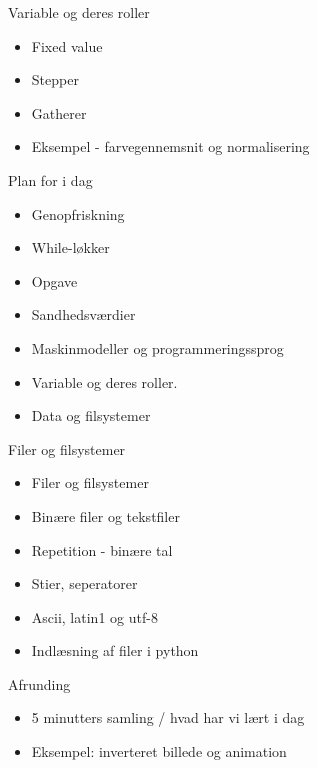 \documentclass[a4paper,landscape]{slides}
\begin{document}
\begin{slide}
	\begin{center} {\large 
            Variable og deres roller
	} \end{center}
	\begin{itemize} \addtolength{\itemsep}{-\baselineskip}
    		\item Fixed value
                \item Stepper
                \item Gatherer

                \item Eksempel - farvegennemsnit og normalisering
	\end{itemize}
\end{slide}

\begin{slide}
	\begin{center} {\large 
            Plan for i dag
	} \end{center}
	\begin{itemize} \addtolength{\itemsep}{-\baselineskip}
    		\item Genopfriskning
    		\item While-løkker
    		\item Opgave
    		\item Sandhedsværdier
    		\item Maskinmodeller og programmeringssprog
    		\item Variable og deres roller.
    		\item Data og filsystemer
	\end{itemize}
\end{slide}

\begin{slide}
	\begin{center} {\large 
            Filer og filsystemer
	} \end{center}
	\begin{itemize} \addtolength{\itemsep}{-\baselineskip}
           \item Filer og filsystemer
           \item Binære filer og tekstfiler
           \item Repetition - binære tal
           \item Stier, seperatorer
           \item Ascii, latin1 og utf-8
           \item Indlæsning af filer i python
	\end{itemize}
\end{slide}
\begin{slide}
	\begin{center} {\large 
            Afrunding
	} \end{center}
	\begin{itemize} \addtolength{\itemsep}{-\baselineskip}
           \item 5 minutters samling / hvad har vi lært i dag
               \item Eksempel: inverteret billede og animation
	\end{itemize}
\end{slide}
\end{document}
